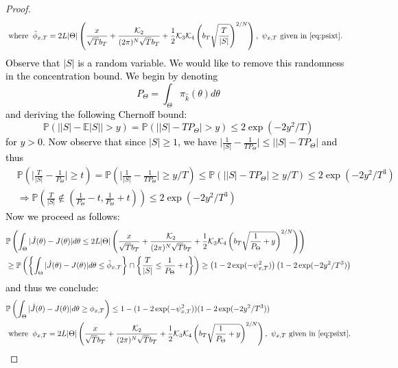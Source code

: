 \documentclass[journal,onecolumn]{IEEEtran}
\newcommand{\CE}{\mathbb{E}}
\newcommand{\PR}{\mathbb{P}}
\newcommand{\dimn}{N}
\newcommand{\mk}{\mathcal{K}}
\newcommand{\kfv}{x} %
\newcommand{\snum}{T}
\newcommand{\hk}{\hat{k}}
\begin{document}
{{\begin{proof}
{\begin{align*}
\begin{split}
        &\text{ where} \;\;\tilde{\phi}_{\kfv,{\color{black}\snum }} = 2 L|\Theta|\left(\frac{\kfv}{\sqrt{{\color{black}\snum }}b_T} + \frac{\mk_2}{(2\pi)^{\dimn}\sqrt{{\color{black}\snum }}b_T} + \frac{1}{2}\mk_3\mk_4 \left(b_T\textcolor{black}{\sqrt{\frac{T}{|S|}}}\right)^{2/\dimn} \right), \,\, \psi_{x,T} \text{ given in } \eqref{eq:psixt}.
    \end{split}
\end{align*}}
\textcolor{black}{Observe that $|S|$ is a random variable. We would like to remove this randomness in the concentration bound. We begin by denoting
\[P_{\Theta} = \int_{\Theta}\pi_{\hk}(\theta)d\theta\]
and deriving the following Chernoff bound:
\[\PR\left(\big||S| - \CE|S| \big| > y\right) = \PR\left(\big||S| - TP_{\Theta}\big|>y \right) \leq 2\exp\left(-2y^2/\snum\right)\]
for $y>0$. Now observe that since $|S| \geq 1$, we have $\big|\frac{1}{|S|} - \frac{1}{TP_{\Theta}}\big| \leq \big||S| - TP_{\Theta}\big|$ and thus
\begin{align*}
    &\PR\left(\bigg|\frac{T}{|S|} - \frac{1}{P_{\Theta}}\bigg| \geq t\right) = \PR\left( \bigg| \frac{1}{|S|} - \frac{1}{TP_{\Theta}}\big| \geq y/T\right) \leq \PR\left( \big| |S| - TP_{\Theta}\big| \geq y/T\right) \leq 2\exp(-2y^2/T^3)\\
    & \Rightarrow \PR\left(\frac{T}{|S|} \notin (\frac{1}{P_{\Theta}} - t,  \frac{1}{P_{\Theta}}+ t)\right) \leq 2\exp(-2y^2/T^3)
\end{align*}
Now we proceed as follows:
\begin{align*}
    &\PR\left(\int_{\Theta}|\hat{J}(\theta) - J(\theta)|d\theta \leq   2 L|\Theta|\left(\frac{\kfv}{\sqrt{\snum }b_T} + \frac{\mk_2}{(2\pi)^{\dimn}\sqrt{{\color{black}\snum }}b_T} + \frac{1}{2}\mk_3\mk_4 \left(b_T\sqrt{\frac{1}{P_{\Theta}}+y}\right)^{2/\dimn} \right)\right)  \\
    & \geq \PR\left(\left\{\int_{\Theta}|\hat{J}(\theta) - J(\theta)|d\theta \leq \tilde{\phi}_{x,T}\right\}\cap\left\{\frac{T}{|S|} \leq \frac{1}{P_{\Theta}}+t\right\}\right) \geq \left(1-2\exp(-\psi_{x,T}^2) \right)\left(1-2\exp(-2y^2/T^3)\right)
\end{align*}
and thus we conclude:
\begin{align*}
     \begin{split}
        &\PR\left(\int_{\Theta}|\hat{J}(\theta) - J(\theta)|d\theta \geq  \phi_{\kfv,{\color{black}\snum }}\right) \leq 1 - (1 - 2\exp(-\psi_{\kfv,{\color{black}{\color{black}\snum }}}^2))(1-2\exp(-2y^2/T^3))\\
        &\text{ where} \;\;\phi_{\kfv,{\color{black}\snum }} = 2 L|\Theta|\left(\frac{\kfv}{\sqrt{{\color{black}\snum }}b_T} + \frac{\mk_2}{(2\pi)^{\dimn}\sqrt{{\color{black}\snum }}b_T} + \frac{1}{2}\mk_3\mk_4 \left(b_T\textcolor{black}{\sqrt{\frac{1}{P_{\Theta}}+y}}\right)^{2/\dimn} \right), \,\, \psi_{x,T} \text{ given in } \eqref{eq:psixt}.

\end{split}
\end{align*}}
\end{proof}}}
\end{document}
